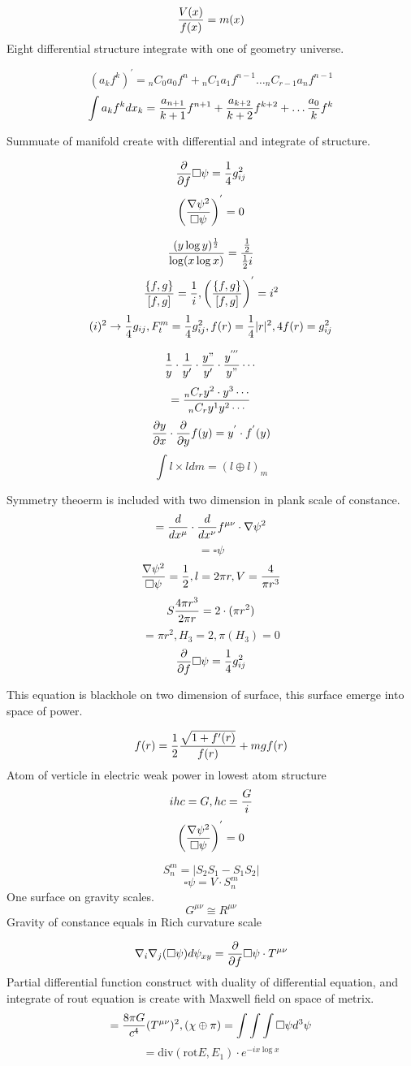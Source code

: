 \documentclass{jsarticle}
\begin{document}
$$ {V(x) \over f(x)} = m(x) $$
Eight differential structure integrate with one of geometry universe.

$$ (a_k f^k)^{'} = {}_nC_0 a_0 f^n + {}_nC_1 a_1 f^{n-1} \dots {}_nC_{r-1}a_{n}f^{n-1} $$
$$ \int a_k f^k dx_k = {a_{n+1} \over {k + 1}}f^{n+1} + {a_{k+2} \over {k+2}}f^{k+2} + \dots {a_0 \over {k}}f^k $$

  Summuate of manifold create with differential and integrate of structure.

  $$ {\partial \over \partial f}\square \psi = {1 \over 4}g_{ij}^2 $$
  $$ \left({\nabla \psi^2 \over \square \psi}\right)^{'} = 0 $$

  $$ {(y \log y)^{1 \over 2} \over \log (x \log x)} = {{1 \over 2} \over {1 \over 2}i} $$
  $$ {\{ f, g\} \over [f,g]} = {1 \over i}, \left({\{f,g\} \over [f,g]}\right)^{'} = i^2 $$
  $$ (i)^2 \to {1 \over 4}g_{ij}, F^m_t = {1 \over 4}g_{ij}^2, f(r) = {1 \over 4}|r|^2, 4f(r) = g_{ij}^2 $$

  $$ {1 \over y}\cdot {1 \over y'}\cdot {y" \over y'}\cdot {y^{'''} \over y"}\cdots $$
  $$ = {{{}_nC_r y^2\cdot y^3 \cdots} \over {{}_nC_r y^1 y^2\cdots}} $$
  $$ {\partial y \over \partial x} \cdot {\partial \over \partial y}f(y) = y^{'}\cdot f^{'}(y) $$
  $$ \int l \times l dm = (l \oplus l)_m $$

  Symmetry theoerm is included with two dimension in plank scale of constance.
  $$ = {d \over  dx^{\mu}} \cdot {d \over dx^{\nu}}f^{\mu\nu}\cdot \nabla \psi^2 $$
  $$ = \square \psi $$
  $$ {\nabla \psi^2 \over \square \psi} = {1 \over 2}, l = 2 \pi r, V = {4 \over {\pi r^3}}  $$
  $$ S {4 \pi r^3 \over 2 \pi r} = 2 \cdot (\pi r^2) $$
  $$ = \pi r^2, H_3 = 2, \pi(H_3) = 0 $$
  $$ {\partial \over \partial f}\square \psi = {1 \over 4}g^2_{ij} $$
  
  This equation is blackhole on two dimension of surface, this surface emerge into space of power.

  $$ f(r) = {1 \over 2}{\sqrt{1 + f'(r)} \over f(r)} + mgf(r) $$
  Atom of verticle in electric weak power in lowest atom structure
  $$ ihc= G, hc ={G \over i} $$
  $$ \left({\nabla \psi^2 \over \square \psi}\right)^{'} = 0 $$

  $$ S_{n}^{m} = |S_2 S_1 - S_1 S_2| $$
  $$ \square \psi = V \cdot S^m_n $$
  One surface on gravity scales.
  $$ G^{\mu\nu} \cong R^{\mu\nu} $$
  Gravity of constance equals in Rich curvature scale

  $$ \nabla_{i}\nabla_{j}(\square \psi) d \psi_{xy} = {\partial \over \partial f}\square \psi \cdot T^{\mu\nu} $$
  Partial differential function construct with duality of differential equation, and integrate of rout equation
is create with Maxwell field on space of metrix.
  $$ = {8 \pi G \over c^4}(T^{\mu\nu})^2, (\chi \oplus \pi) = \int \int \int \square \psi d^3 \psi $$
  $$ = \mathrm{div}(\mathrm{rot} E,E_1)\cdot e^{-i x \log x} $$
\end{document}
